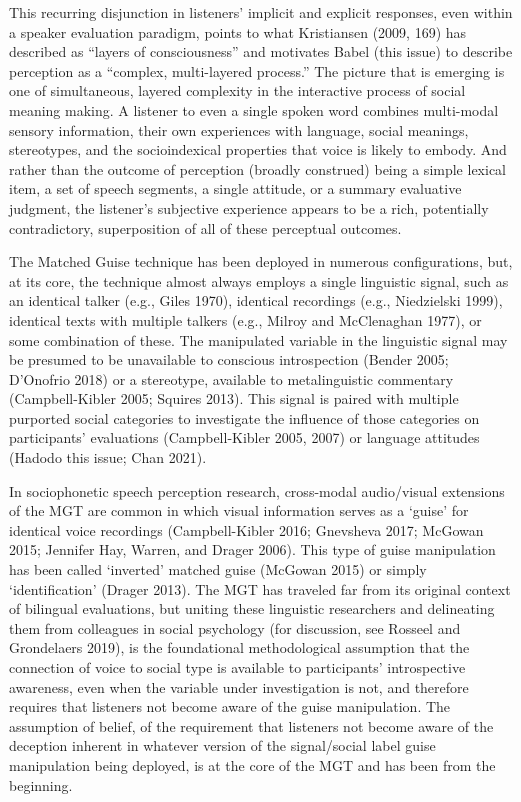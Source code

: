 \documentclass[
  letterpaper,
  DIV=11,
  numbers=noendperiod]{scrartcl}
\begin{document}
This recurring disjunction in listeners' implicit and explicit
responses, even within a speaker evaluation paradigm, points to what
Kristiansen (2009, 169) has described as ``layers of consciousness'' and
motivates Babel (this issue) to describe perception as a ``complex,
multi-layered process.'' The picture that is emerging is one of
simultaneous, layered complexity in the interactive process of social
meaning making. A listener to even a single spoken word combines
multi-modal sensory information, their own experiences with language,
social meanings, stereotypes, and the socioindexical properties that
voice is likely to embody. And rather than the outcome of perception
(broadly construed) being a simple lexical item, a set of speech
segments, a single attitude, or a summary evaluative judgment, the
listener's subjective experience appears to be a rich, potentially
contradictory, superposition of all of these perceptual outcomes.

The Matched Guise technique has been deployed in numerous
configurations, but, at its core, the technique almost always employs a
single linguistic signal, such as an identical talker (e.g., Giles
1970), identical recordings (e.g., Niedzielski 1999), identical texts
with multiple talkers (e.g., Milroy and McClenaghan 1977), or some
combination of these. The manipulated variable in the linguistic signal
may be presumed to be unavailable to conscious introspection (Bender
2005; D'Onofrio 2018) or a stereotype, available to metalinguistic
commentary (Campbell-Kibler 2005; Squires 2013). This signal is paired
with multiple purported social categories to investigate the influence
of those categories on participants' evaluations (Campbell-Kibler 2005,
2007) or language attitudes (Hadodo this issue; Chan 2021).

In sociophonetic speech perception research, cross-modal audio/visual
extensions of the MGT are common in which visual information serves as a
`guise' for identical voice recordings (Campbell-Kibler 2016; Gnevsheva
2017; McGowan 2015; Jennifer Hay, Warren, and Drager 2006). This type of
guise manipulation has been called `inverted' matched guise (McGowan
2015) or simply `identification' (Drager 2013). The MGT has traveled far
from its original context of bilingual evaluations, but uniting these
linguistic researchers and delineating them from colleagues in social
psychology (for discussion, see Rosseel and Grondelaers 2019), is the
foundational methodological assumption that the connection of voice to
social type is available to participants' introspective awareness, even
when the variable under investigation is not, and therefore requires
that listeners not become aware of the guise manipulation. The
assumption of belief, of the requirement that listeners not become aware
of the deception inherent in whatever version of the signal/social label
guise manipulation being deployed, is at the core of the MGT and has
been from the beginning.
\end{document}
